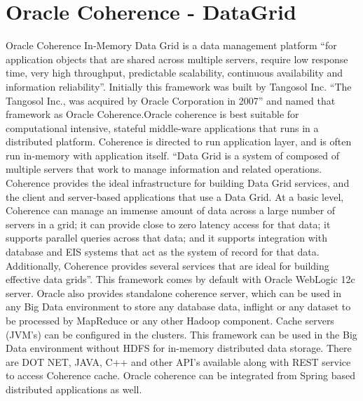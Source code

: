 \section{Oracle Coherence - DataGrid}

Oracle Coherence In-Memory Data Grid is a data management platform “for application objects that are shared across multiple servers, 
require low response time, very high throughput, predictable scalability, 
continuous availability and information reliability”\cite{hid-sp18-514-OracleCoherence}. 
Initially this framework was built by Tangosol Inc. “The Tangosol Inc., 
was acquired by Oracle Corporation in 2007”\cite{hid-sp18-514-coherencewiki} 
and named that framework as Oracle Coherence.Oracle coherence is best suitable for computational intensive, 
stateful middle-ware applications that runs in a distributed platform. 
Coherence is directed to run application layer, and is often run in-memory with application itself. 
“Data Grid is a system of composed of multiple servers that work to manage information and related operations. Coherence provides the ideal infrastructure for building Data Grid services, and the client and server-based applications that use a Data Grid. 
At a basic level, Coherence can manage an immense amount of data across a large number of servers in a grid; 
it can provide close to zero latency access for that data; it supports parallel queries across that data; 
and it supports integration with database and EIS systems that act as the system of record for that data. Additionally, 
Coherence provides several services that are ideal for building effective data grids”\cite{hid-sp18-514-OracleCoherence}.
This framework comes by default with Oracle WebLogic 12c server. 
Oracle also provides standalone coherence server, which can be used in any Big Data environment to store any database data, 
inflight or any dataset to be processed by MapReduce or any other Hadoop component. 
Cache servers (JVM’s) can be configured in the clusters. 
This framework can be used in the Big Data environment without HDFS for in-memory distributed data storage. There are DOT NET, 
JAVA, C++ and other API’s available along with REST service to access Coherence cache\cite{hid-sp18-514-OracleCoherence}. 
Oracle coherence can be integrated from Spring based distributed applications as well\cite{hid-sp18-514-CoherenceSpringInt}.
